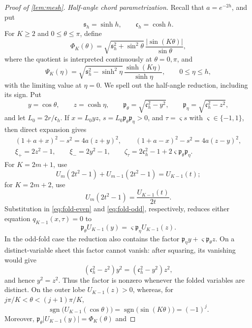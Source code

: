 \documentclass[review,hidelinks,onefignum,onetabnum]{siamart251216}
\begin{document}
\begin{proof}[Proof of \cref{lem:mesh}]
\medskip\noindent\emph{Half-angle chord parametrization.}\quad
Recall that \(a=e^{-2h}\), and put
\[
 \mathfrak s_h=\sinh h,\qquad \mathfrak c_h=\cosh h.
\]
For \(K\geq2\) and \(0\leq\theta\leq\pi\), define
\begin{equation}\label{eq:Phi-Psi-def}
 \Phi_K(\theta)=\sqrt{\mathfrak s_h^2+\sin^2\theta}\,
 \frac{|\sin(K\theta)|}{\sin\theta},
\end{equation}
where the quotient is interpreted continuously at \(\theta=0,\pi\),
and
\[
 \Psi_K(\eta)=\sqrt{\mathfrak s_h^2-\sinh^2\eta}\,
 \frac{\sinh(K\eta)}{\sinh\eta},\qquad0\leq\eta\leq h,
\]
with the limiting value at \(\eta=0\).  We spell out the half-angle
reduction, including its sign.  Put
\[
 y=\cos\theta,\qquad z=\cosh\eta,\qquad
 \mathfrak p_\theta=\sqrt{\mathfrak c_h^2-y^2},\qquad
 \mathfrak p_\eta=\sqrt{\mathfrak c_h^2-z^2},
\]
and let \(L_0=2r/\mathfrak c_h\).  If
\(x=L_0yz\), \(s=L_0\mathfrak p_\theta\mathfrak p_\eta>0\), and
\(\tau=\varsigma s\) with \(\varsigma\in\{-1,1\}\), then direct
expansion gives
\begin{equation}\label{eq:half-variable-identities}
\begin{gathered}
 (1+a+x)^2-s^2=4a(z+y)^2,\qquad
 (1+a-x)^2-s^2=4a(z-y)^2,\\
 \xi_+=2z^2-1,\qquad \xi_-=2y^2-1,\qquad
 \zeta_\tau=2\mathfrak c_h^2-1
 +2\varsigma\mathfrak p_\theta\mathfrak p_\eta.
\end{gathered}
\end{equation}
For \(K=2m+1\), use
\[
 U_m(2t^2-1)+U_{m-1}(2t^2-1)=U_{K-1}(t);
\]
for \(K=2m+2\), use
\[
 U_m(2t^2-1)=\frac{U_{K-1}(t)}{2t}.
\]
Substitution in \eqref{eq:fold-even} and \eqref{eq:fold-odd},
respectively, reduces either equation \(q_{K-1}(x,\tau)=0\) to
\begin{equation}\label{eq:signed-half-chord}
 \mathfrak p_\theta U_{K-1}(y)
 =\varsigma\mathfrak p_\eta U_{K-1}(z).
\end{equation}
In the odd-fold case the reduction also contains the factor
\(\mathfrak p_\eta y+\varsigma\mathfrak p_\theta z\).  On a
distinct-variable sheet this factor cannot vanish: after squaring, its
vanishing would give
\[
 (\mathfrak c_h^2-z^2)y^2=(\mathfrak c_h^2-y^2)z^2,
\]
and hence \(y^2=z^2\).  Thus the factor is nonzero whenever the folded
variables are distinct.  On the outer lobe
\(U_{K-1}(z)>0\), whereas, for
\(j\pi/K<\theta<(j+1)\pi/K\),
\[
 \operatorname{sgn}\bigl(U_{K-1}(\cos\theta)\bigr)
 =\operatorname{sgn}\bigl(\sin(K\theta)\bigr)=(-1)^j.
\]
Moreover,
\(\mathfrak p_\theta|U_{K-1}(y)|=\Phi_K(\theta)\) and

\end{proof}
\end{document}
